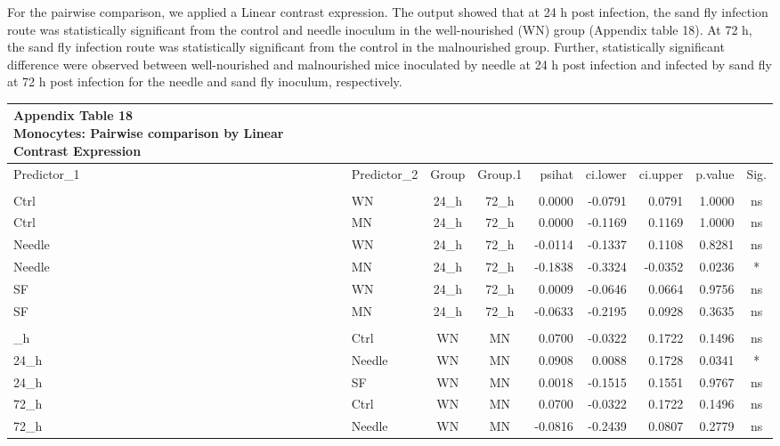 \documentclass[
  12pt,
  letterpaper,
]{article}
\begin{document}
For the pairwise comparison, we applied a Linear contrast expression. The output showed that at 24 h post infection, the sand fly infection route was statistically significant from the control and needle inoculum in the well-nourished (WN) group (Appendix table 18). At 72 h, the sand fly infection route was statistically significant from the control in the malnourished group. Further, statistically significant difference were observed between well-nourished and malnourished mice inoculated by needle at 24 h post infection and infected by sand fly at 72 h post infection for the needle and sand fly inoculum, respectively.

\begingroup
\fontsize{12.0pt}{14.4pt}\selectfont
\begin{longtable}{llccrrrrc}
\caption*{
{\large \textbf{Appendix Table 18}} \\ 
{\small \textbf{Monocytes: Pairwise comparison by Linear Contrast Expression}}
} \\ 
\toprule
Predictor\_1 & Predictor\_2 & {Group} & {Group.1} & {psihat} & {ci.lower} & {ci.upper} & {p.value} & {Sig.} \\ 
\midrule\addlinespace[2.5pt]
\multicolumn{9}{l}{Predictor: Time\_point} \\[2.5pt] 
\midrule\addlinespace[2.5pt]
Ctrl & WN & 24\_h & 72\_h & 0.0000 & -0.0791 & 0.0791 & 1.0000 & ns \\ 
Ctrl & MN & 24\_h & 72\_h & 0.0000 & -0.1169 & 0.1169 & 1.0000 & ns \\ 
Needle & WN & 24\_h & 72\_h & -0.0114 & -0.1337 & 0.1108 & 0.8281 & ns \\ 
Needle & MN & 24\_h & 72\_h & -0.1838 & -0.3324 & -0.0352 & 0.0236 & * \\ 
SF & WN & 24\_h & 72\_h & 0.0009 & -0.0646 & 0.0664 & 0.9756 & ns \\ 
SF & MN & 24\_h & 72\_h & -0.0633 & -0.2195 & 0.0928 & 0.3635 & ns \\ 
\midrule\addlinespace[2.5pt]
\multicolumn{9}{l}{Predictor: Diet} \\[2.5pt] 
\midrule\addlinespace[2.5pt]
24\_h & Ctrl & WN & MN & 0.0700 & -0.0322 & 0.1722 & 0.1496 & ns \\ 
24\_h & Needle & WN & MN & 0.0908 & 0.0088 & 0.1728 & 0.0341 & * \\ 
24\_h & SF & WN & MN & 0.0018 & -0.1515 & 0.1551 & 0.9767 & ns \\ 
72\_h & Ctrl & WN & MN & 0.0700 & -0.0322 & 0.1722 & 0.1496 & ns \\ 
72\_h & Needle & WN & MN & -0.0816 & -0.2439 & 0.0807 & 0.2779 & ns \\ 

\end{longtable}
\end{document}
